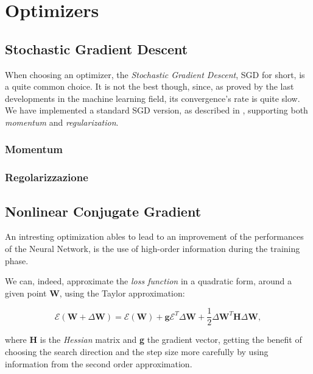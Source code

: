 \chapter{Optimizers} %
\label{cha:optimizers}
	\section{Stochastic Gradient Descent} %
	\label{sec:sgd}
		When choosing an optimizer, the \textit{Stochastic Gradient Descent}, SGD for short, is a quite common
		choice. It is not the best though, since, as proved by the last developments in the machine learning
		field, its convergence's rate is quite slow. We have implemented a standard SGD version, as described in
		\cite{Goodfellow-et-al-2016}, supporting both \textit{momentum} and \textit{regularization}.
		\cite{LIVIERIS2013491}
		\subsection{Momentum} %
		\label{sec:momentum}


		\subsection{Regolarizzazione} %
		\label{sec:regolarizzazione}

	\section{Nonlinear Conjugate Gradient} %
	\label{sec:nonlinear_conjugate_gradient}

		An intresting optimization ables to lead to an improvement of the performances of the Neural Network, is the use of high-order information during the training phase.

		We can, indeed, approximate the \textit{loss function} in a quadratic form, around a given point \textbf{W}, using the Taylor approximation:

		 \begin{equation}
		 	\label{quadratic}
		    \mathcal{E}(\textbf{W} + \Delta\textbf{W}) = \mathcal{E}(\textbf{W})+\textbf{g}\mathcal{E}^T\Delta\textbf{W}+ \frac{1}{2}\Delta\textbf{W}^T\textbf{H}\Delta\textbf{W},
		 \end{equation}

		where \textbf{H} is the \textit{Hessian} matrix and \textbf{g} the gradient vector, getting the benefit of choosing the search direction and the step size more carefully by using information from the second order approximation.

